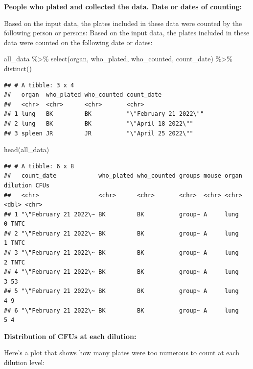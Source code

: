 \documentclass[
]{book}
\newenvironment{Shaded}{\begin{snugshade}}{\end{snugshade}}
\newcommand{\FunctionTok}[1]{\textcolor[rgb]{0.00,0.00,0.00}{#1}}
\newcommand{\NormalTok}[1]{#1}
\newcommand{\SpecialCharTok}[1]{\textcolor[rgb]{0.00,0.00,0.00}{#1}}
\begin{document}
\textbf{People who plated and collected the data. Date or dates of counting:}

Based on the input data, the plates included in these data were counted by
the following person or persons:
Based on the input data, the plates included in these data were counted on
the following date or dates:

\begin{Shaded}
\begin{Highlighting}[]
\NormalTok{all\_data }\SpecialCharTok{\%\textgreater{}\%}
  \FunctionTok{select}\NormalTok{(organ, who\_plated, who\_counted, count\_date) }\SpecialCharTok{\%\textgreater{}\%}
  \FunctionTok{distinct}\NormalTok{()}
\end{Highlighting}
\end{Shaded}

\begin{verbatim}
## # A tibble: 3 x 4
##   organ  who_plated who_counted count_date            
##   <chr>  <chr>      <chr>       <chr>                 
## 1 lung   BK         BK          "\"February 21 2022\""
## 2 lung   BK         BK          "\"April 18 2022\""   
## 3 spleen JR         JR          "\"April 25 2022\""
\end{verbatim}

\begin{Shaded}
\begin{Highlighting}[]
\FunctionTok{head}\NormalTok{(all\_data)}
\end{Highlighting}
\end{Shaded}

\begin{verbatim}
## # A tibble: 6 x 8
##   count_date            who_plated who_counted groups mouse organ dilution CFUs 
##   <chr>                 <chr>      <chr>       <chr>  <chr> <chr>    <dbl> <chr>
## 1 "\"February 21 2022\~ BK         BK          group~ A     lung         0 TNTC 
## 2 "\"February 21 2022\~ BK         BK          group~ A     lung         1 TNTC 
## 3 "\"February 21 2022\~ BK         BK          group~ A     lung         2 TNTC 
## 4 "\"February 21 2022\~ BK         BK          group~ A     lung         3 53   
## 5 "\"February 21 2022\~ BK         BK          group~ A     lung         4 9    
## 6 "\"February 21 2022\~ BK         BK          group~ A     lung         5 4
\end{verbatim}

\textbf{Distribution of CFUs at each dilution:}

Here's a plot that shows how many plates were too numerous to count at each
dilution level:
\end{document}
